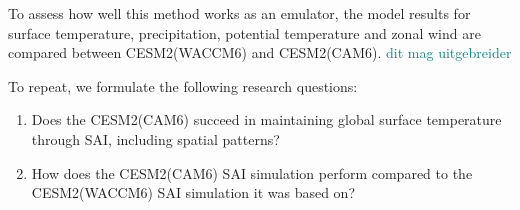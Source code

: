 To assess how well this method works as an emulator, the model results for surface temperature, precipitation, potential temperature and zonal wind are compared between CESM2(WACCM6) and CESM2(CAM6). \textcolor{teal}{dit mag uitgebreider}

To repeat, we formulate the following research questions:

\begin{enumerate}
    \item Does the CESM2(CAM6) succeed in maintaining global surface temperature through SAI, including spatial patterns?
    \item How does the CESM2(CAM6) SAI simulation perform compared to the CESM2(WACCM6) SAI simulation it was based on?
\end{enumerate}